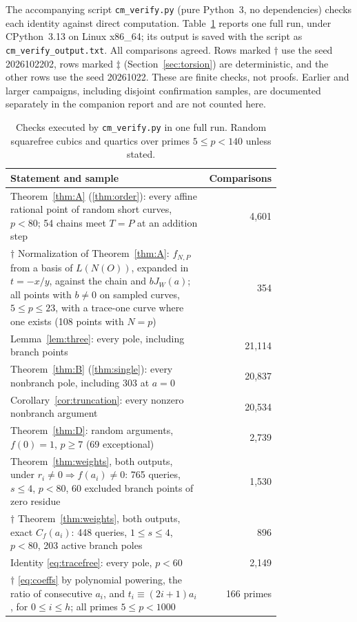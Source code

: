 \documentclass[11pt,a4paper]{article}
\numberwithin{equation}{section}
\theoremstyle{plain}
\theoremstyle{definition}
\begin{document}
The accompanying script \texttt{cm\_verify.py} (pure Python~3, no dependencies) checks each identity against direct computation. Table~\ref{tab:checks} reports one full run, under CPython~3.13 on Linux x86\_64; its output is saved with the script as \texttt{cm\_verify\_output.txt}. All comparisons agreed. Rows marked $\dagger$ use the seed 2026102202, rows marked $\ddagger$ (Section~\ref{sec:torsion}) are deterministic, and the other rows use the seed 20261022. These are finite checks, not proofs. Earlier and larger campaigns, including disjoint confirmation samples, are documented separately in the companion report and are not counted here.

\begin{table}[ht]
\centering
\caption{Checks executed by \texttt{cm\_verify.py} in one full run. Random squarefree cubics and quartics over primes $5\le p<140$ unless stated.}\label{tab:checks}
\small
\begin{tabular}{@{}p{0.78\linewidth}r@{}}
\toprule
Statement and sample & Comparisons\\
\midrule
Theorem~\ref{thm:A} (\ref{thm:order}): every affine rational point of random short curves, $p<80$; 54 chains meet $T=P$ at an addition step & 4{,}601\\
$\dagger$ Normalization of Theorem~\ref{thm:A}: $f_{N,P}$ from a basis of $L(N(O))$, expanded in $t=-x/y$, against the chain and $bJ_W(a)$; all points with $b\neq0$ on sampled curves, $5\le p\le23$, with a trace-one curve where one exists (108 points with $N=p$) & 354\\
Lemma~\ref{lem:three}: every pole, including branch points & 21{,}114\\
Theorem~\ref{thm:B} (\ref{thm:single}): every nonbranch pole, including 303 at $a=0$ & 20{,}837\\
Corollary~\ref{cor:truncation}: every nonzero nonbranch argument & 20{,}534\\
Theorem~\ref{thm:D}: random arguments, $f(0)=1$, $p\ge7$ (69 exceptional) & 2{,}739\\
Theorem~\ref{thm:weights}, both outputs, under $r_i\neq0\Rightarrow f(a_i)\neq0$: 765 queries, $s\le4$, $p<80$, 60 excluded branch points of zero residue & 1{,}530\\
$\dagger$ Theorem~\ref{thm:weights}, both outputs, exact $C_f(a_i)$: 448 queries, $1\le s\le4$, $p<80$, 203 active branch poles & 896\\
Identity \eqref{eq:tracefree}: every pole, $p<60$ & 2{,}149\\
$\dagger$ \eqref{eq:coeffs} by polynomial powering, the ratio of consecutive $a_i$, and $t_i\equiv(2i+1)a_i$, for $0\le i\le h$; all primes $5\le p<1000$ & 166 primes\\

\end{tabular}
\end{table}
\end{document}
